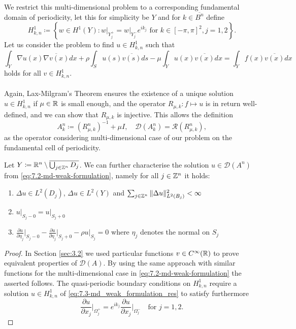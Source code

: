 We restrict this multi-dimensional problem to a corresponding fundamental domain of periodicity, let this for simplicity be $Y$ and for $k \in \overline{B^{n}}$ define 
\[ H^{1}_{k, n} \coloneqq \left\{ w \in H^{1}(Y) \colon w \big|_{Y_{j}^{+}} = w \big|_{Y_{j}^{-}} e^{i k_{j}} \text{ for } k \in [-\pi, \pi]^{2}, j = 1,2 \right\}. \]
 Let us consider the problem to find $u \in H^{1}_{k, n}$ such that
	\begin{equation}
		\int_{Y} \nabla u(x) \overline{\nabla v(x)} dx + \rho \int_{S} u(s) \overline{v(s)} ds - \mu \int_{Y} u(x) \overline{v(x)} dx = \int_{Y} f(x) \overline{v(x)} dx \label{eq:7.3-md_weak_formulation_res}
	\end{equation} 
holds for all $v \in H^{1}_{k, n}$. 
~\\ ~\\
Again, Lax-Milgram's Theorem ensures the existence of a unique solution $u \in H^{1}_{k, n}$ if $\mu \in \mathbb{R}$ is small enough, and the operator $R_{\mu, k} \colon f \mapsto u$ is in return well-defined, and we can show that $R_{\mu, k}$ is injective. This allows the definition 
	\[ A_{k}^{n} \coloneqq \left(R_{\mu, k}^{n}\right)^{-1} + \mu I, \quad \mathcal{D}(A_{k}^{n}) = \mathcal{R}(R_{\mu, k}^{n}), \]
as the operator considering multi-dimensional case of our problem on the fundamental cell of periodicity.
\begin{theorem} Let $Y \coloneqq \mathbb{R}^{n} \setminus \overline{\bigcup_{j \in \mathbb{Z}^{n}} D_{j}}$. We can further characterise the solution $u \in \mathcal{D}(A^{n})$ from \eqref{eq:7.2-md-weak-formulation}, namely for all $j \in \mathbb{Z}^{n}$ it holds:
	\begin{enumerate} %
		\item $\Delta u \in L^{2}(D_{j})$, $\Delta u \in L^{2}(Y)$ and $\sum_{j \in \mathbb{Z}^{n}} \|\Delta u \|_{L^{2}(B_{j})}^{2} < \infty$
		\item $u \big|_{S_{j} - 0} = u \big|_{S_{j} + 0}$
		\item $\frac{\partial u}{\partial \eta_{j}} \big|_{S_{j} - 0} - \frac{\partial u}{\partial \eta_{j}} \big|_{S_{j} + 0} - \rho u \big|_{S_{j}} = 0$ where $\eta_{j}$ denotes the normal on $S_{j}$
	\end{enumerate}
\end{theorem}
	
\begin{proof} %
 	In Section \ref{sec:3.2} we used particular functions $v \in C^{\infty}(\mathbb{R})$ to prove equivalent properties of $\mathcal{D}(A)$. By using the same approach with similar functions for the multi-dimensional case in \eqref{eq:7.2-md-weak-formulation} the asserted follows. 
	The quasi-periodic boundary conditions on $H^{1}_{k,n}$ require a solution $u \in H^{1}_{k, n}$ of \eqref{eq:7.3-md_weak_formulation_res} to satisfy furthermore
	\[ \frac{\partial u}{\partial x_{j}}\big|_{\Omega_{j}^{+}} = e^{ik_{j}} \frac{\partial u}{\partial x_{j}}\big|_{\Omega_{j}^{-}} \quad \text{for } j = 1, 2.  \]	
\end{proof} \vspace{-0.75cm}

